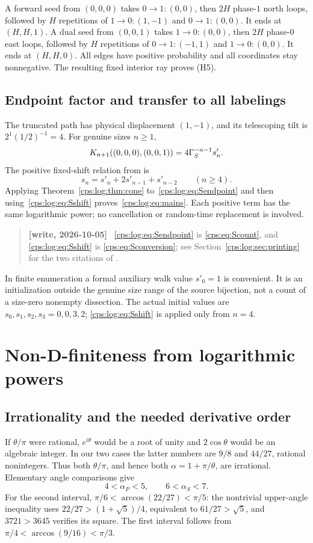 \documentclass[11pt,letterpaper]{article}
\numberwithin{equation}{section}
\theoremstyle{remark}\newtheorem{remark}[theorem]{Remark}
\newenvironment{writenotelog}{\begin{quote}\small\sloppy\textbf{[write, 2026-10-05]}\ }{\end{quote}}
\newcommand{\ap}{\alpha_P}\newcommand{\as}{\alpha_S}
\begin{document}
A forward seed from $(0,0,0)$ takes $0\to1:(0,0)$, then $2H$
phase-$1$ north loops, followed by $H$ repetitions of
$1\to0:(1,-1)$ and $0\to1:(0,0)$. It ends at $(H,H,1)$.
A dual seed from $(0,0,1)$ takes $1\to0:(0,0)$, then $2H$ phase-$0$
east loops, followed by $H$ repetitions of
$0\to1:(-1,1)$ and $1\to0:(0,0)$. It ends at $(H,H,0)$.
All edges have positive probability and all coordinates stay
nonnegative. The resulting fixed interior ray proves (H5).

\subsection{Endpoint factor and transfer to all labelings}
The truncated path has physical displacement $(1,-1)$, and its
telescoping tilt is $2^1(1/2)^{-1}=4$. For genuine sizes $n\ge1$,
\begin{equation}\label{cps:log:eq:Sendpoint}
 K_{n+1}((0,0,0),(0,0,1))=4\Gamma_S^{-n-1}s'_n.
\end{equation}
The positive fixed-shift relation from \cite[Proposition 19]{FNS} is
\begin{equation}\label{cps:log:eq:Sshift}
 s_n=s'_n+2s'_{n-1}+s'_{n-2}\qquad(n\ge4).
\end{equation}
Applying Theorem~\ref{cps:log:thm:cone} to~\eqref{cps:log:eq:Sendpoint} and then
using~\eqref{cps:log:eq:Sshift} proves~\eqref{cps:log:eq:mains}. Each positive term
has the same logarithmic power; no cancellation or random-time
replacement is involved.

\begin{writenotelog}
\eqref{cps:log:eq:Sendpoint} is \eqref{cps:eq:Scount}, and \eqref{cps:log:eq:Sshift} is
\eqref{cps:eq:Sconversion}; see Section~\ref{cps:log:sec:printing} for the two citations of
\cite{FNS}.
\end{writenotelog}

In finite enumeration a formal auxiliary walk value $s'_0=1$ is
convenient. It is an initialization outside the genuine size range
of the source bijection, not a count of a size-zero nonempty
dissection. The actual initial values are $s_0,s_1,s_2,s_3=0,0,3,2$;
\eqref{cps:log:eq:Sshift} is applied only from $n=4$.

\section{Non-D-finiteness from logarithmic powers}\label{cps:log:sec:nonD}
\subsection{Irrationality and the needed derivative order}
If $\theta/\pi$ were rational, $e^{i\theta}$ would be a root of
unity and $2\cos\theta$ would be an algebraic integer. In our two
cases the latter numbers are $9/8$ and $44/27$, rational nonintegers.
Thus both $\theta/\pi$, and hence both $\alpha=1+\pi/\theta$, are
irrational. Elementary angle comparisons give
\[
 4<\ap<5,\qquad 6<\as<7.
\]
For the second interval,
$\pi/6<\arccos(22/27)<\pi/5$: the nontrivial upper-angle inequality
uses $22/27>(1+\sqrt5)/4$, equivalent to
$61/27>\sqrt5$, and $3721>3645$ verifies its square. The first
interval follows from $\pi/4<\arccos(9/16)<\pi/3$.
\end{document}
